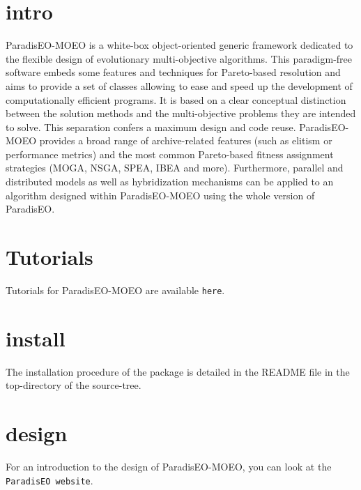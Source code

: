 \section{intro}\label{main_intro}
Paradis\-EO-MOEO is a white-box object-oriented generic framework dedicated to the flexible design of evolutionary multi-objective algorithms. This paradigm-free software embeds some features and techniques for Pareto-based resolution and aims to provide a set of classes allowing to ease and speed up the development of computationally efficient programs. It is based on a clear conceptual distinction between the solution methods and the multi-objective problems they are intended to solve. This separation confers a maximum design and code reuse. Paradis\-EO-MOEO provides a broad range of archive-related features (such as elitism or performance metrics) and the most common Pareto-based fitness assignment strategies (MOGA, NSGA, SPEA, IBEA and more). Furthermore, parallel and distributed models as well as hybridization mechanisms can be applied to an algorithm designed within Paradis\-EO-MOEO using the whole version of Paradis\-EO.\section{Tutorials}\label{main_tutorials}
Tutorials for Paradis\-EO-MOEO are available {\tt here}.\section{install}\label{main_install}
The installation procedure of the package is detailed in the README file in the top-directory of the source-tree.\section{design}\label{main_design}
For an introduction to the design of Paradis\-EO-MOEO, you can look at the {\tt Paradis\-EO website}. 